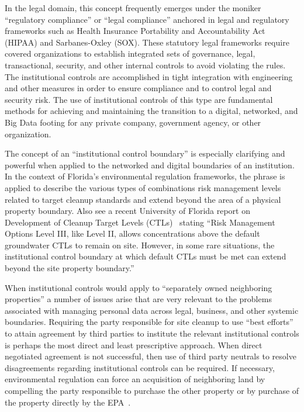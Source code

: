 In the legal domain, this concept frequently emerges under the moniker ``regulatory compliance'' or ``legal compliance'' anchored in legal and regulatory frameworks such as Health Insurance Portability and Accountability Act (HIPAA) and Sarbanes-Oxley (SOX).
These statutory legal frameworks require covered organizations to establish integrated sets of governance, legal, transactional, security, and other internal controls to avoid violating the rules.
The institutional controls are accomplished in tight integration with engineering and other measures in order to ensure compliance and to control legal and security risk.
The use of institutional controls of this type are fundamental methods for achieving and maintaining the transition to a digital, networked, and Big Data footing for any private company, government agency, or other organization.

The concept of an ``institutional control boundary'' is especially clarifying and powerful when applied to the networked and digital boundaries of an institution.
In the context of Florida's environmental regulation frameworks, the phrase is applied to describe the various types of combinations risk management levels related to target cleanup standards and extend beyond the area of a physical property boundary.
Also see a recent University of Florida report on Development of Cleanup Target Levels (CTLs)~\cite{UFlorida2005} stating
``Risk Management Options Level III, like Level II, allows concentrations above the default groundwater CTLs to remain on site.
However, in some rare situations, the institutional control boundary at which default CTLs must be met can extend beyond the site property boundary.''


When institutional controls would apply to ``separately owned neighboring properties'' a number of issues arise that are very relevant to the problems associated with managing personal data across legal, business, and other systemic boundaries.
Requiring the party responsible for site cleanup to use ``best efforts'' to attain agreement by third parties to institute the relevant institutional controls is perhaps the most direct and least prescriptive approach.  When direct negotiated agreement is not successful, then use of third party neutrals to resolve disagreements regarding institutional controls can be required.  If necessary, environmental regulation can force an acquisition of neighboring land by compelling the party responsible to purchase the other property or by purchase of the property directly by the EPA~\cite{EPA-540-R-09-001}.

